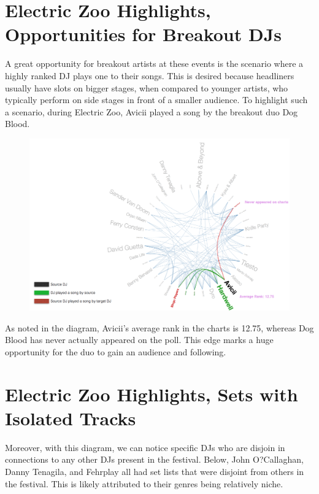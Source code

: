 \documentclass[12pt]{dalcsthesis}
\begin{document}
\section{Electric Zoo Highlights, Opportunities for Breakout DJs}

A great opportunity for breakout artists at these events is the scenario where a highly ranked DJ plays one to their songs. This is desired because headliners usually have slots on bigger stages, when compared to younger artists, who typically perform on side stages in front of a smaller audience. To highlight such a scenario, during Electric Zoo, Avicii played a song by the breakout duo Dog Blood. \newpage

\begin{figure}[h]
\includegraphics[scale=.5]{avicii_dog_blood}
\centering
\end{figure}

As noted in the diagram, Avicii's average rank in the charts is 12.75, whereas Dog Blood has never actually appeared on the poll. This edge marks a huge opportunity for the duo to gain an audience and following.

\section{Electric Zoo Highlights, Sets with Isolated Tracks}

Moreover, with this diagram, we can notice specific DJs who are disjoin in connections to any other DJs present in the festival. Below, John O?Callaghan, Danny Tenagila, and Fehrplay all had set lists that were disjoint from others in the festival. This is likely attributed to their genres being relatively niche. \newpage
\end{document}
